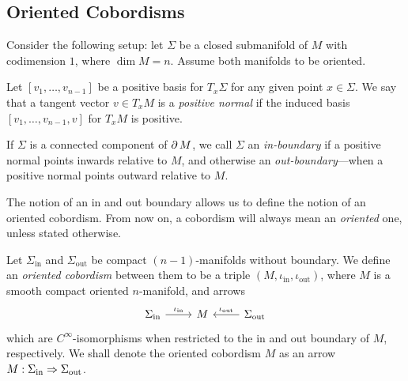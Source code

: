 \subsection{Oriented Cobordisms}

Consider the following setup: let \(\Sigma\) be a closed submanifold of \(M\)
with codimension \(1\), where \(\dim M = n\). Assume both manifolds to be
oriented.

\begin{definition}
    \label{def:positive-normal-manifold}
    Let \([v_1, \dots, v_{n-1}]\) be a positive basis for \(T_x \Sigma\) for any
    given point \(x \in \Sigma\). We say that a tangent vector \(v \in T_x M\) is a
    \emph{positive normal} if the induced basis \([v_1, \dots, v_{n-1}, v]\) for
    \(T_x M\) is positive.
\end{definition}

\begin{definition}
    \label{def:in-out-boundaries}
    If \(\Sigma\) is a connected component of \(\operatorname{\partial} M\), we call \(\Sigma\) an
    \emph{in-boundary} if a positive normal points inwards relative to \(M\), and
    otherwise an \emph{out-boundary}---when a positive normal points outward
    relative to \(M\).
\end{definition}


The notion of an in and out boundary allows us to define the notion of an
oriented cobordism. From now on, a cobordism will always mean an
\emph{oriented} one, unless stated otherwise.

\begin{definition}
    \label{def:oriented-cobordism}
    Let \(\Sigma_{\text{in}}\) and \(\Sigma_{\text{out}}\) be compact
    \((n-1)\)-manifolds without boundary. We define an \emph{oriented cobordism}
    between them to be a triple \((M, \iota_{\text{in}}, \iota_{\text{out}})\),
    where \(M\) is a smooth compact oriented \(n\)-manifold, and arrows
    \[
        \begin{tikzcd}
            \Sigma_{\text{in}} \ar[r, "\iota_{\text{in}}"] &M
            &\Sigma_{\text{out}} \ar[l, "\iota_{\text{out}}"']
        \end{tikzcd}
    \]
    which are \(C^{\infty}\)-isomorphisms when restricted to the in and out boundary
    of \(M\), respectively. We shall denote the oriented cobordism \(M\) as an
    arrow \(M: \Sigma_{\text{in}} \Rightarrow \Sigma_{\text{out}}\).
\end{definition}

